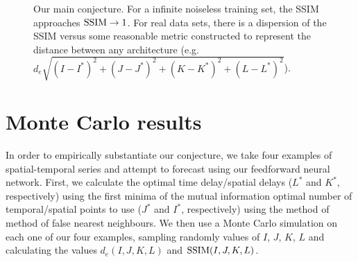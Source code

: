 \documentclass[journal]{IEEEtran}
\begin{document}
\begin{figure}
\caption{Our main conjecture. For a infinite noiseless training set, the SSIM approaches $\textnormal{SSIM} \to 1$. For real data sets,
there is a dispersion of the SSIM versus some reasonable metric constructed to
 represent the distance between any architecture (e.g.\ $d_e\sqrt{(I-I^*)^2+(J-J^*)^2+(K-K^*)^2+(L-L^*)^2}$).
}
\label{conjecture}
\end{figure}





\section{Monte Carlo results}

In order to empirically substantiate our conjecture, we take four examples of spatial-temporal series and attempt
to forecast using our feedforward neural network. First, we calculate the optimal time delay/spatial delays ($L^*$ and $K^*$, respectively)
using the first minima of the mutual information optimal number of temporal/spatial points to use
($J^*$ and $I^*$, respectively) using the method of method of false nearest neighbours.
We then use a Monte Carlo simulation on each one of our four examples, sampling randomly values
of $I$, $J$, $K$, $L$ and calculating the values $d_e(I,J,K,L)$ and $\textnormal{SSIM}(I,J,K,L)$.
\end{document}

